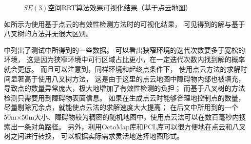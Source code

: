 \begin{figure}[!ht]
  \setlength{\subfigcapskip}{-1bp}
  \centering
  \begin{minipage}{\textwidth}

  \centering
  \subfigure{\label{fig:rrtse3_pcl_in_sparse_env_overview}}\addtocounter{subfigure}{-2}
  \hspace{0.2em}
  \subfigure{\label{fig:rrtse3_pcl_in_sparse_env_detail}}\addtocounter{subfigure}{-2}
  \hspace{0.2em}
  \subfigure{\label{fig:rrtse3_pcl_in_narrow_passage_overview}}\addtocounter{subfigure}{-2}
  \hspace{0.2em}
  \subfigure{\label{fig:rrtse3_pcl_in_narrow_passage_detail}}\addtocounter{subfigure}{-2}
  
  \end{minipage}
  \caption{$SE(3)$空间RRT算法效果可视化结果（基于点云地图）}
  \label{fig:performance_of_rrtse3_pcl}
\end{figure}

如所示为使用基于点云的有效性检测方法时的可视化结果，
可见得到的解与基于八叉树的方法并无很大区别。

中列出了测试中所得到的一些数据。
可以看出狭窄环境的迭代次数要多于宽松的环境，
这是因为狭窄环境中可行区域占比更小，在一定迭代次数内找到解的概率就会更低。
而且可以注意到，同样环境和起终点条件下，
使用点云方法的求解时间显著高于使用八叉树方法，
这是由于这里的点云地图中障碍物内部也被填充，导致点的数量异常庞大，极大地增加了有效性检测的负担；
而基于八叉树的方法检测只需要用到障碍物表面信息。
如果在生成点云时能够合理地控制点的数量，尽量剔除冗余点，就能使点云法的求解速度大大提高；
在后文中所用到的一个50m$\times$50m大小、障碍物较为稠密的随机地图中，使用点云法可以在数百毫秒内搜索出一条对角路径。
另外，利用OctoMap库和PCL库\cite{rusu20113d}可以很方便地在点云和八叉树之间进行转换，
可以根据实际需求灵活地选择地图形式。

